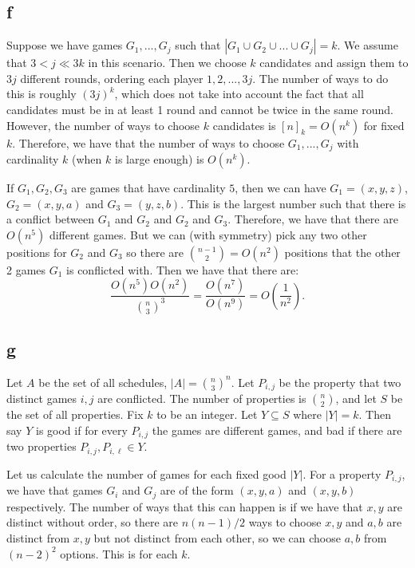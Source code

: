 \documentclass[]{article}
\theoremstyle{definition}
\numberwithin{theorem}{section}
\numberwithin{equation}{section}
\begin{document}
\subsection{f}
Suppose we have games $G_1, ..., G_j$ such that $|G_1 \cup G_2 \cup ... \cup G_j| = k$. We assume that $3 < j \ll 3k$ in this scenario. Then we choose $k$ candidates and assign them to $3j$ different rounds, ordering each player $1, 2, ..., 3j$. The number of ways to do this is roughly $(3j)^k$, which does not take into account the fact that all candidates must be in at least 1 round and cannot be twice in the same round. However, the number of ways to choose $k$ candidates is $[n]_k  = O(n^k)$ for fixed $k$. Therefore, we have that the number of ways to choose $G_1, ..., G_j$ with cardinality $k$ (when $k$ is large enough) is $O(n^k)$. 
\par
If $G_1, G_2, G_3$ are games that have cardinality $5$, then we can have $G_1 = (x, y, z)$, $G_2 = (x, y, a)$ and $G_3 = (y, z, b)$. This is the largest number such that there is a conflict between $G_1$ and $G_2$ and $G_2$ and $G_3$. Therefore, we have that there are $O(n^5)$ different games. But we can (with symmetry) pick any two other positions for $G_2$ and $G_3$ so there are $\binom{n - 1 }{2} = O(n^2)$ positions that the other 2 games $G_1$ is conflicted with. Then we have that there are:
\begin{equation}
	\frac{O(n^5) O(n^2)}{\binom{n}{3}^3} = \frac{O(n^7)}{O(n^9)} = O(\frac{1}{n^2}).
\end{equation}

\subsection{g}
Let $A$ be the set of all schedules, $|A| = \binom{n}{3}^n$. 
Let $P_{i,j}$ be the property that two distinct games $i, j$ are conflicted. The number of properties is $\binom{n}{2}$, and let $S$ be the set of all properties. 
Fix $k$ to be an integer. 
Let $Y \subseteq S$ where $|Y| = k$. Then say $Y$ is good if for every $P_{i, j}$ the games are different games, and bad if there are two properties $P_{i, j}, P_{i, \ell} \in Y$. 

Let us calculate the number of games for each fixed good $|Y|$. For a property $P_{i, j}$, we have that games $G_i$ and $G_j$ are of the form $(x, y, a)$ and $(x, y, b)$ respectively. The number of ways that this can happen is if we have that $x, y$ are distinct without order, so there are $n(n-1)/2$ ways to choose $x, y$ and $a, b$ are distinct from $x, y$ but not distinct from each other, so we can choose $a, b$ from $(n-2)^2$ options. This is for each $k$.
\end{document}
